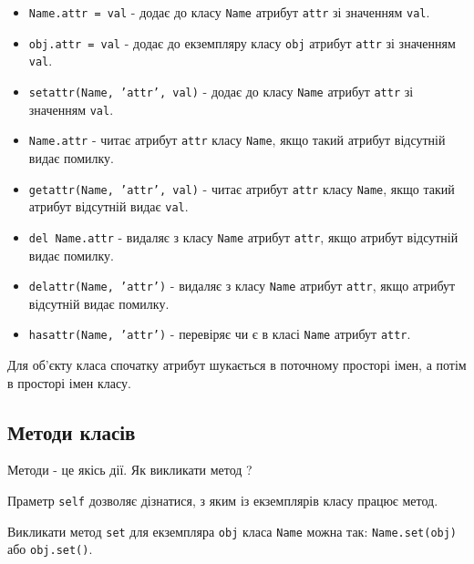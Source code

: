 \begin{frame}
\begin{itemize}
  \item \texttt{Name.attr = val} - додає до класу \texttt{Name} атрибут \texttt{attr} зі значенням \texttt{val}.
  \item \texttt{obj.attr = val} - додає до екземпляру класу \texttt{obj} атрибут \texttt{attr} зі значенням \texttt{val}.
  \item \texttt{setattr(Name, 'attr', val)} - додає до класу \texttt{Name} атрибут \texttt{attr} зі значенням \texttt{val}.
  \item \texttt{Name.attr} - читає атрибут \texttt{attr} класу \texttt{Name}, якщо такий атрибут відсутній видає помилку.
  \item \texttt{getattr(Name, 'attr', val)} - читає атрибут \texttt{attr}  класу \texttt{Name}, якщо такий атрибут відсутній видає \texttt{val}.
\end{itemize}

\end{frame}

\begin{frame}
\begin{itemize}
  \item \texttt{del Name.attr} - видаляє з класу \texttt{Name} атрибут \texttt{attr}, якщо атрибут відсутній видає помилку.
   \item \texttt{delattr(Name, 'attr')} - видаляє з класу \texttt{Name} атрибут \texttt{attr}, якщо атрибут відсутній видає помилку.
  \item \texttt{hasattr(Name, 'attr')} - перевіряє чи є в класі \texttt{Name} атрибут \texttt{attr}.
\end{itemize}
Для об'єкту класа спочатку атрибут шукається в поточному просторі імен, а потім в просторі імен класу.
\end{frame}

\subsection{Методи класів} 
\begin{frame}
Методи - це якісь дії. Як викликати метод ?

Праметр \texttt{self} дозволяє дізнатися, з яким із екземплярів класу працює метод.

Викликати метод \texttt{set} для екземпляра \texttt{obj} класа \texttt{Name} можна так: \texttt{Name.set(obj)} або \texttt{obj.set()}.
\end{frame}

